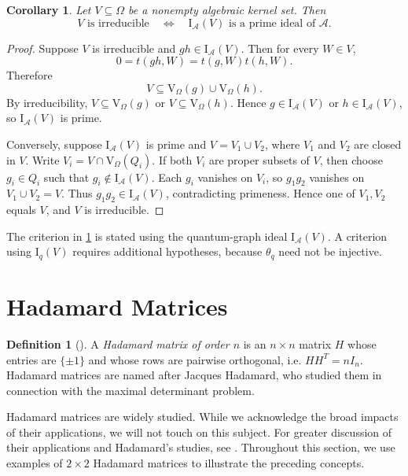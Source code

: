 \documentclass[a4paper,12pt]{article}
\let\cite\parencite
\newtheorem{corollary}[lemma]{Corollary}
\theoremstyle{definition}
\newtheorem{definition}[lemma]{Definition}
\newcommand\cA{\mathcal{A}}
\newcommand\V{\mathrm{V}_{\Omega}}
\newcommand\Iq{\mathrm{I}_{q}}
\newcommand\IA{\mathrm{I}_{\cA}}
\newcommand\thetaq{\theta_q}
\begin{document}
\begin{corollary}\label{corollary: irreducible prime}
Let $V\subseteq\Omega$ be a nonempty algebraic kernel set. Then
\[
    V\text{ is irreducible}\quad\Longleftrightarrow\quad \IA(V)\text{ is a prime ideal of }\cA.
\]
\end{corollary}

\begin{proof}
Suppose $V$ is irreducible and $gh\in\IA(V)$. Then for every $W\in V$,
\[
    0=t(gh,W)=t(g,W)t(h,W).
\]
Therefore
\[
    V\subseteq\V(g)\cup\V(h).
\]
By irreducibility, $V\subseteq\V(g)$ or $V\subseteq\V(h)$. Hence $g\in\IA(V)$ or $h\in\IA(V)$, so $\IA(V)$ is prime.

Conversely, suppose $\IA(V)$ is prime and $V=V_1\cup V_2$, where $V_1$ and $V_2$ are closed in $V$. Write $V_i=V\cap\V(Q_i)$. If both $V_i$ are proper subsets of $V$, then choose $g_i\in Q_i$ such that $g_i\notin\IA(V)$. Each $g_i$ vanishes on $V_i$, so $g_1g_2$ vanishes on $V_1\cup V_2=V$. Thus $g_1g_2\in\IA(V)$, contradicting primeness. Hence one of $V_1,V_2$ equals $V$, and $V$ is irreducible.
\end{proof}

The criterion in \cref{corollary: irreducible prime} is stated using the quantum-graph ideal $\IA(V)$. A criterion using $\Iq(V)$ requires additional hypotheses, because $\thetaq$ need not be injective.

\section{Hadamard Matrices}\label{section: Had}

\begin{definition}[\cite{ferber2018number}]
A \textit{Hadamard matrix of order $n$} is an $n\times n$ matrix $H$ whose entries are $\{\pm1\}$ and whose rows are pairwise orthogonal, i.e. $HH^T=nI_n$. Hadamard matrices are named after Jacques Hadamard, who studied them in connection with the maximal determinant problem.
\end{definition}

Hadamard matrices are widely studied. While we acknowledge the broad impacts of their applications, we will not touch on this subject. For greater discussion of their applications and Hadamard's studies, see \cite{ferber2018number, lofano2021hadamard, banica2021complex, breen2020hadamard, li2020note}. Throughout this section, we use examples of $2\times2$ Hadamard matrices to illustrate the preceding concepts.
\end{document}
